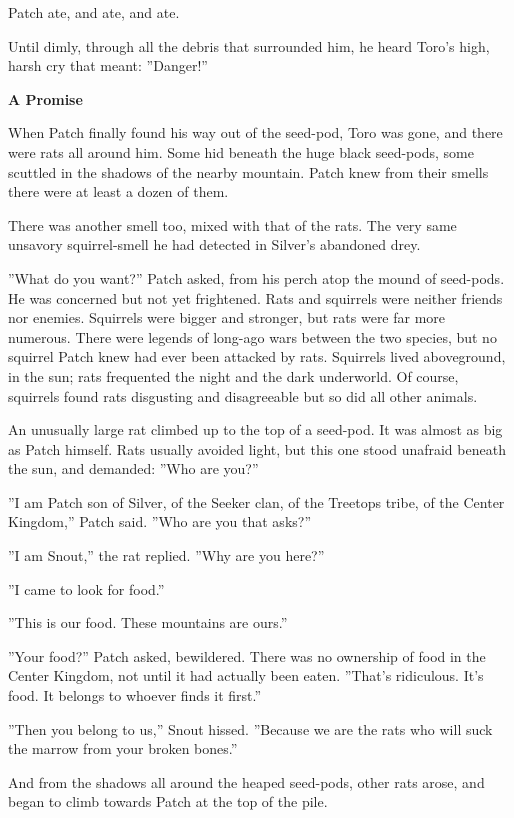 \documentclass[11pt]{article}
\begin{document}
Patch ate, and ate, and ate.\par
Until dimly, through all the debris that surrounded him, he heard Toro's high, harsh cry that meant: ''Danger!''\par
\par
{\bf A Promise\par
}\par
 When Patch finally found his way out of the seed-pod, Toro was gone, and there were rats all around him. Some hid beneath the huge black seed-pods, some scuttled in the shadows of the nearby mountain. Patch knew from their smells there were at least a dozen of them.\par
There was another smell too, mixed with that of the rats. The very same unsavory squirrel-smell he had detected in Silver's abandoned drey.\par
 ''What do you want?'' Patch asked, from his perch atop the mound of seed-pods. He was concerned but not yet frightened. Rats and squirrels were neither friends nor enemies. Squirrels were bigger and stronger, but rats were far more numerous. There were legends of long-ago wars between the two species, but no squirrel Patch knew had ever been attacked by rats. Squirrels lived aboveground, in the sun; rats frequented the night and the dark underworld. Of course, squirrels found rats disgusting and disagreeable %
 but so did all other animals.\par
 An unusually large rat climbed up to the top of a seed-pod. It was almost as big as Patch himself. Rats usually avoided light, but this one stood unafraid beneath the sun, and demanded: ''Who are you?''\par
 ''I am Patch son of Silver, of the Seeker clan, of the Treetops tribe, of the Center Kingdom,'' Patch said. ''Who are you that asks?''\par
 ''I am Snout,'' the rat replied. ''Why are you here?''\par
 ''I came to look for food.''\par
 ''This is our food. These mountains are ours.''\par
 ''Your food?'' Patch asked, bewildered. There was no ownership of food in the Center Kingdom, not until it had actually been eaten. ''That's ridiculous. It's food. It belongs to whoever finds it first.''\par
 ''Then you belong to us,'' Snout hissed. ''Because we are the rats who will suck the marrow from your broken bones.''\par
 And from the shadows all around the heaped seed-pods, other rats arose, and began to climb towards Patch at the top of the pile.\par
\end{document}
